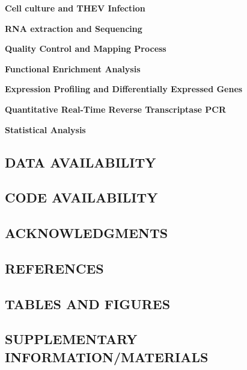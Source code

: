 \documentclass[
]{article}
\begin{document}
\textbf{Cell culture and THEV Infection}

\textbf{RNA extraction and Sequencing}

\textbf{Quality Control and Mapping Process}

\textbf{Functional Enrichment Analysis}

\textbf{Expression Profiling and Differentially Expressed Genes}

\textbf{Quantitative Real-Time Reverse Transcriptase PCR}

\textbf{Statistical Analysis} \newpage

\subsection{DATA AVAILABILITY}\label{data-availability}

\newpage

\subsection{CODE AVAILABILITY}\label{code-availability}

\newpage

\subsection{ACKNOWLEDGMENTS}\label{acknowledgments}

\newpage

\subsection{REFERENCES}\label{references}

\newpage

\subsection{TABLES AND FIGURES}\label{tables-and-figures}

\newpage

\subsection*{SUPPLEMENTARY
INFORMATION/MATERIALS}\label{supplementary-informationmaterials}
\end{document}

